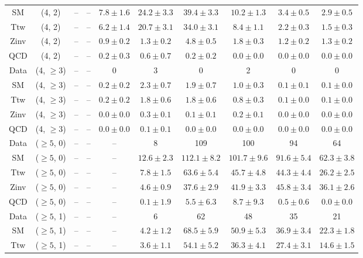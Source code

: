 \begin{table}[h!]
{\begin{tabular}{cccccccccc}
	SM & (4, 2) & -- & -- & $7.8\pm 1.6$ & $24.2\pm 3.3$ & $39.4\pm 3.3$ & $10.2\pm 1.3$ & $3.4\pm 0.5$ & $2.9\pm 0.5$ \\[0.5ex] 
	Ttw & (4, 2) & -- & -- & $6.2\pm 1.4$ & $20.7\pm 3.1$ & $34.0\pm 3.1$ & $8.4\pm 1.1$ & $2.2\pm 0.3$ & $1.5\pm 0.3$ \\[0.5ex] 
	Zinv & (4, 2) & -- & -- & $0.9\pm 0.2$ & $1.3\pm 0.2$ & $4.8\pm 0.5$ & $1.8\pm 0.3$ & $1.2\pm 0.2$ & $1.3\pm 0.2$ \\[0.5ex] 
	QCD & (4, 2) & -- & -- & $0.2\pm 0.3$ & $0.6\pm 0.7$ & $0.2\pm 0.2$ & $0.0\pm 0.0$ & $0.0\pm 0.0$ & $0.0\pm 0.0$ \\[0.5ex] 
	Data & (4, $\ge3$) & -- & -- & 0 & 3 & 0 & 2 & 0 & 0 \\[0.5ex] 
	SM & (4, $\ge3$) & -- & -- & $0.2\pm 0.2$ & $2.3\pm 0.7$ & $1.9\pm 0.7$ & $1.0\pm 0.3$ & $0.1\pm 0.1$ & $0.1\pm 0.0$ \\[0.5ex] 
	Ttw & (4, $\ge3$) & -- & -- & $0.2\pm 0.2$ & $1.8\pm 0.6$ & $1.8\pm 0.6$ & $0.8\pm 0.3$ & $0.1\pm 0.0$ & $0.1\pm 0.0$ \\[0.5ex] 
	Zinv & (4, $\ge3$) & -- & -- & $0.0\pm 0.0$ & $0.3\pm 0.1$ & $0.1\pm 0.1$ & $0.2\pm 0.1$ & $0.0\pm 0.0$ & $0.0\pm 0.0$ \\[0.5ex] 
	QCD & (4, $\ge3$) & -- & -- & $0.0\pm 0.0$ & $0.1\pm 0.1$ & $0.0\pm 0.0$ & $0.0\pm 0.0$ & $0.0\pm 0.0$ & $0.0\pm 0.0$ \\[0.5ex] 
	Data & ($\ge5$, 0) & -- & -- & -- & 8 & 109 & 100 & 94 & 64 \\[0.5ex] 
	SM & ($\ge5$, 0) & -- & -- & -- & $12.6\pm 2.3$ & $112.1\pm 8.2$ & $101.7\pm 9.6$ & $91.6\pm 5.4$ & $62.3\pm 3.8$ \\[0.5ex] 
	Ttw & ($\ge5$, 0) & -- & -- & -- & $7.8\pm 1.5$ & $63.6\pm 5.4$ & $45.7\pm 4.8$ & $44.3\pm 4.4$ & $26.2\pm 2.5$ \\[0.5ex] 
	Zinv & ($\ge5$, 0) & -- & -- & -- & $4.6\pm 0.9$ & $37.6\pm 2.9$ & $41.9\pm 3.3$ & $45.8\pm 3.4$ & $36.1\pm 2.6$ \\[0.5ex] 
	QCD & ($\ge5$, 0) & -- & -- & -- & $0.1\pm 1.9$ & $5.5\pm 6.3$ & $8.7\pm 9.3$ & $0.5\pm 0.6$ & $0.0\pm 0.0$ \\[0.5ex] 
	Data & ($\ge5$, 1) & -- & -- & -- & 6 & 62 & 48 & 35 & 21 \\[0.5ex] 
	SM & ($\ge5$, 1) & -- & -- & -- & $4.2\pm 1.2$ & $68.5\pm 5.9$ & $50.9\pm 5.3$ & $36.9\pm 3.4$ & $22.3\pm 1.8$ \\[0.5ex] 
	Ttw & ($\ge5$, 1) & -- & -- & -- & $3.6\pm 1.1$ & $54.1\pm 5.2$ & $36.3\pm 4.1$ & $27.4\pm 3.1$ & $14.6\pm 1.5$ \\[0.5ex] 

\end{tabular}}
\end{table}
